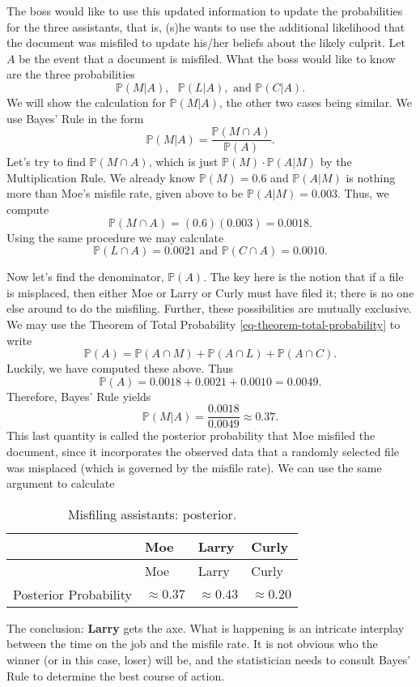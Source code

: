 \documentclass[]{book}
\numberwithin{equation}{chapter}
\numberwithin{figure}{chapter}
\theoremstyle{plain}
\theoremstyle{definition}
\theoremstyle{remark}
\theoremstyle{definition}
\theoremstyle{definition}
\theoremstyle{remark}
\begin{document}
The boss would like to use this updated information to update the
probabilities for the three assistants, that is, (s)he wants to use the
additional likelihood that the document was misfiled to update his/her
beliefs about the likely culprit. Let \(A\) be the event that a document
is misfiled. What the boss would like to know are the three
probabilities \[
\mathbb{P}(M|A),\mbox{ }\mathbb{P}(L|A),\mbox{ and }\mathbb{P}(C|A).
\] We will show the calculation for \(\mathbb{P}(M|A)\), the other two
cases being similar. We use Bayes' Rule in the form \[
\mathbb{P}(M|A)=\frac{\mathbb{P}(M\cap A)}{\mathbb{P}(A)}.
\] Let's try to find \(\mathbb{P}(M\cap A)\), which is just
\(\mathbb{P}(M)\cdot\mathbb{P}(A|M)\) by the Multiplication Rule. We
already know \(\mathbb{P}(M)=0.6\) and \(\mathbb{P}(A|M)\) is nothing
more than Moe's misfile rate, given above to be
\(\mathbb{P}(A|M)=0.003\). Thus, we compute \[
\mathbb{P}(M\cap A)=(0.6)(0.003)=0.0018.
\] Using the same procedure we may calculate \[
\mathbb{P}(L \cap A)=0.0021\mbox{ and }\mathbb{P}(C \cap A)=0.0010.
\]

Now let's find the denominator, \(\mathbb{P}(A)\). The key here is the
notion that if a file is misplaced, then either Moe or Larry or Curly
must have filed it; there is no one else around to do the misfiling.
Further, these possibilities are mutually exclusive. We may use the
Theorem of Total Probability \eqref{eq-theorem-total-probability} to
write \[
\mathbb{P}(A)=\mathbb{P}(A\cap M)+\mathbb{P}(A\cap L)+\mathbb{P}(A\cap
C).  \] Luckily, we have computed these above. Thus \[
\mathbb{P}(A)=0.0018+0.0021+0.0010=0.0049.  \] Therefore, Bayes' Rule
yields \[ \mathbb{P}(M|A)=\frac{0.0018}{0.0049}\approx0.37.  \] This
last quantity is called the posterior probability that Moe misfiled the
document, since it incorporates the observed data that a randomly
selected file was misplaced (which is governed by the misfile rate). We
can use the same argument to calculate

\begin{longtable}[]{@{}llll@{}}
\caption{Misfiling assistants: posterior.}\tabularnewline
\toprule
& Moe & Larry & Curly\tabularnewline
\midrule
\endfirsthead
\toprule
& Moe & Larry & Curly\tabularnewline
\midrule
\endhead
Posterior Probability & \(\approx0.37\) & \(\approx0.43\) &
\(\approx0.20\)\tabularnewline
\bottomrule
\end{longtable}

The conclusion: \textbf{Larry} gets the axe. What is happening is an
intricate interplay between the time on the job and the misfile rate. It
is not obvious who the winner (or in this case, loser) will be, and the
statistician needs to consult Bayes' Rule to determine the best course
of action.
\end{document}
